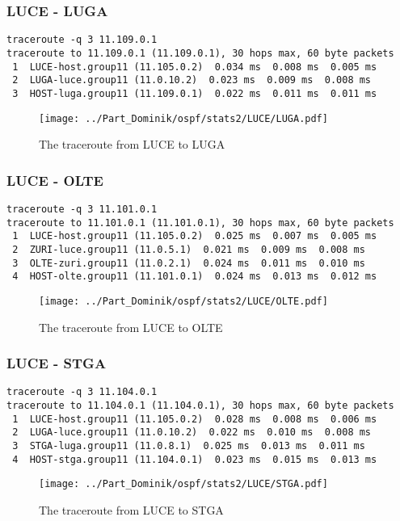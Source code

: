 \subsubsection{LUCE - LUGA}
\begin{lstlisting}
traceroute -q 3 11.109.0.1
traceroute to 11.109.0.1 (11.109.0.1), 30 hops max, 60 byte packets
 1  LUCE-host.group11 (11.105.0.2)  0.034 ms  0.008 ms  0.005 ms
 2  LUGA-luce.group11 (11.0.10.2)  0.023 ms  0.009 ms  0.008 ms
 3  HOST-luga.group11 (11.109.0.1)  0.022 ms  0.011 ms  0.011 ms
\end{lstlisting}
\begin{figure}[H]
\centering
\texttt{[image: ../Part\_Dominik/ospf/stats2/LUCE/LUGA.pdf]}
\caption{The traceroute from LUCE to LUGA}
\end{figure}
\clearpage
\subsubsection{LUCE - OLTE}
\begin{lstlisting}
traceroute -q 3 11.101.0.1
traceroute to 11.101.0.1 (11.101.0.1), 30 hops max, 60 byte packets
 1  LUCE-host.group11 (11.105.0.2)  0.025 ms  0.007 ms  0.005 ms
 2  ZURI-luce.group11 (11.0.5.1)  0.021 ms  0.009 ms  0.008 ms
 3  OLTE-zuri.group11 (11.0.2.1)  0.024 ms  0.011 ms  0.010 ms
 4  HOST-olte.group11 (11.101.0.1)  0.024 ms  0.013 ms  0.012 ms
\end{lstlisting}
\begin{figure}[H]
\centering
\texttt{[image: ../Part\_Dominik/ospf/stats2/LUCE/OLTE.pdf]}
\caption{The traceroute from LUCE to OLTE}
\end{figure}
\clearpage
\subsubsection{LUCE - STGA}
\begin{lstlisting}
traceroute -q 3 11.104.0.1
traceroute to 11.104.0.1 (11.104.0.1), 30 hops max, 60 byte packets
 1  LUCE-host.group11 (11.105.0.2)  0.028 ms  0.008 ms  0.006 ms
 2  LUGA-luce.group11 (11.0.10.2)  0.022 ms  0.010 ms  0.008 ms
 3  STGA-luga.group11 (11.0.8.1)  0.025 ms  0.013 ms  0.011 ms
 4  HOST-stga.group11 (11.104.0.1)  0.023 ms  0.015 ms  0.013 ms
\end{lstlisting}
\begin{figure}[H]
\centering
\texttt{[image: ../Part\_Dominik/ospf/stats2/LUCE/STGA.pdf]}
\caption{The traceroute from LUCE to STGA}
\end{figure}
\clearpage
